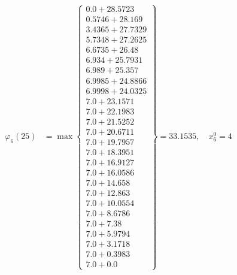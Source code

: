 \documentclass{article}
\begin{document}
\begin{align*}
  
\varphi_{6}(25) &= \max \left\{ \begin{array}{c}
0.0 + 28.5723 \\
 0.5746 + 28.169 \\
 3.4365 + 27.7329 \\
 5.7348 + 27.2625 \\
 6.6735 + 26.48 \\
 6.934 + 25.7931 \\
 6.989 + 25.357 \\
 6.9985 + 24.8866 \\
 6.9998 + 24.0325 \\
 7.0 + 23.1571 \\
 7.0 + 22.1983 \\
 7.0 + 21.5252 \\
 7.0 + 20.6711 \\
 7.0 + 19.7957 \\
 7.0 + 18.3951 \\
 7.0 + 16.9127 \\
 7.0 + 16.0586 \\
 7.0 + 14.658 \\
 7.0 + 12.863 \\
 7.0 + 10.0554 \\
 7.0 + 8.6786 \\
 7.0 + 7.38 \\
 7.0 + 5.9794 \\
 7.0 + 3.1718 \\
 7.0 + 0.3983 \\
 7.0 + 0.0
\end{array} \right\}=33.1535,\quad x_{6}^0=4\\
  
  
  

\end{align*}
\end{document}
